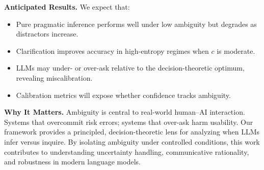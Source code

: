 \documentclass[10pt]{article}
\begin{document}
\vspace{0.5em}
\noindent
\textbf{Anticipated Results.}
We expect that:
\begin{itemize}
    \item Pure pragmatic inference performs well under low ambiguity but degrades as distractors increase.
    \item Clarification improves accuracy in high-entropy regimes when $c$ is moderate.
    \item LLMs may under- or over-ask relative to the decision-theoretic optimum, revealing miscalibration.
    \item Calibration metrics will expose whether confidence tracks ambiguity.
\end{itemize}

\vspace{0.5em}
\noindent
\textbf{Why It Matters.}
Ambiguity is central to real-world human--AI interaction. Systems that overcommit risk errors; systems that over-ask harm usability. Our framework provides a principled, decision-theoretic lens for analyzing when LLMs infer versus inquire. By isolating ambiguity under controlled conditions, this work contributes to understanding uncertainty handling, communicative rationality, and robustness in modern language models.
\end{document}
